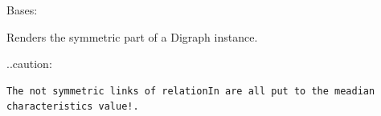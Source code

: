 \documentclass[letterpaper,10pt,english]{sphinxmanual}
\begin{document}

\begin{fulllineitems}
\label{techDoc:digraphs.SymmetricPartialDigraph}
Bases: {\hyperref[techDoc:digraphs.Digraph]{}}

Renders the symmetric part of a Digraph instance.

..caution:

\begin{Verbatim}[commandchars=\\\{\}]
The not symmetric links of relationIn are all put to the meadian characteristics value!.
\end{Verbatim}

\end{fulllineitems}

\end{document}

